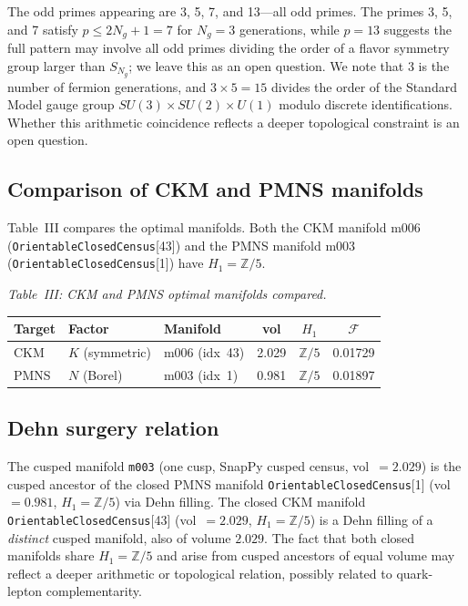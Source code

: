 \documentclass[floatfix,aps,prd,twocolumn,showpacs,superscriptaddress,longbibliography]{revtex4-2}
\begin{document}
The odd primes appearing are 3, 5, 7, and 13---all odd primes.
The primes 3, 5, and 7 satisfy $p \leq 2N_g + 1 = 7$ for $N_g = 3$
generations, while $p = 13$ suggests the full pattern may involve
all odd primes dividing the order of a flavor symmetry group larger
than $S_{N_g}$; we leave this as an open question.
We note that 3 is the number of fermion generations, and
$3 \times 5 = 15$ divides the order of the Standard Model gauge group
$SU(3)\times SU(2)\times U(1)$ modulo discrete identifications.
Whether this arithmetic coincidence reflects a deeper topological
constraint is an open question.

\subsection{Comparison of CKM and PMNS manifolds}

Table~III compares the optimal manifolds.
Both the CKM manifold m006 (\texttt{OrientableClosedCensus}[43])
and the PMNS manifold m003 (\texttt{OrientableClosedCensus}[1])
have $H_1 = \mathbb{Z}/5$.


\begin{center}
\textit{Table~III: CKM and PMNS optimal manifolds compared.}\\
\smallskip
\begin{tabular}{lllccc}
\toprule
Target & Factor & Manifold & vol & $H_1$ & $\mathcal{F}$ \\
\midrule
CKM  & $K$ (symmetric) & m006 (idx~43) & 2.029 & $\mathbb{Z}/5$ & 0.01729 \\
PMNS & $N$ (Borel)     & m003 (idx~1)  & 0.981 & $\mathbb{Z}/5$ & 0.01897 \\
\bottomrule
\end{tabular}
\end{center}


\subsection{Dehn surgery relation}

The cusped manifold \texttt{m003} (one cusp, SnapPy cusped census,
vol~$= 2.029$) is the cusped ancestor of the closed PMNS manifold
\texttt{OrientableClosedCensus}[1] (vol~$= 0.981$, $H_1 = \mathbb{Z}/5$)
via Dehn filling.
The closed CKM manifold \texttt{OrientableClosedCensus}[43]
(vol~$= 2.029$, $H_1 = \mathbb{Z}/5$) is a Dehn filling of a
\emph{distinct} cusped manifold, also of volume $2.029$.
The fact that both closed manifolds share $H_1 = \mathbb{Z}/5$ and
arise from cusped ancestors of equal volume may reflect a deeper
arithmetic or topological relation, possibly related to
quark-lepton complementarity.
\end{document}
